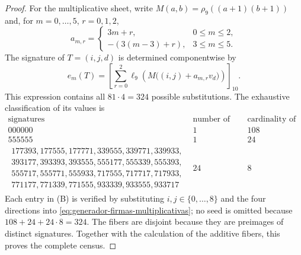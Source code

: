 \begin{proof}
For the multiplicative sheet, write
\(M(a,b)=\rho_9((a+1)(b+1))\) and, for \(m=0,\ldots,5\), \(r=0,1,2\),
\[
 a_{m,r}=\begin{cases}
 3m+r,&0\le m\le2,\\
 -(3(m-3)+r),&3\le m\le5.
 \end{cases}
\]
The signature of \(T=(i,j,d)\) is determined componentwise by
\begin{equation}
 e_m(T)=\left[\sum_{r=0}^{2}
 \ell_9\!\left(M\bigl((i,j)+a_{m,r}v_d\bigr)\right)\right]_{10}.
 \label{eq:generador-firmas-multiplicativas}
\end{equation}
This expression contains all \(81\cdot4=324\) possible substitutions. The
exhaustive classification of its values is
\[
\begin{array}{c|c|c}
\text{signatures}&\text{number of signatures}&\text{cardinality of each fiber}\\ \hline
000000&1&108\\
555555&1&24\\
\begin{gathered}
177393,177555,177771,339555,339771,339933,\\
393177,393393,393555,555177,555339,555393,\\
555717,555771,555933,717555,717717,717933,\\
771177,771339,771555,933339,933555,933717
\end{gathered}&24&8
\end{array}
\tag{B}
\label{eq:tabla-firmas-multiplicativas}
\]
Each entry in (B) is verified by substituting \(i,j\in\{0,\ldots,8\}\) and
the four directions into \eqref{eq:generador-firmas-multiplicativas}; no
seed is omitted because
\(108+24+24\cdot8=324\). The fibers are disjoint because they are preimages of
distinct signatures. Together with the calculation of the additive fibers, this proves the
complete census.
\end{proof}


